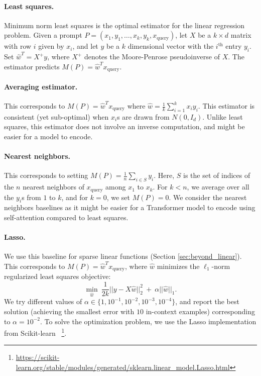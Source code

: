 \paragraph{Least squares.} Minimum norm least squares is the optimal estimator for the linear regression problem. Given a prompt $P = (x_1, y_1, \ldots, x_k, y_k, x_{\text{query}})$, let $X$ be a $k \times d$ matrix with row $i$ given by $x_i$, and let $y$ be a $k$ dimensional vector with the $i^{\text{th}}$ entry $y_i$. Set $\hat{w}^T  = X^{+} y$, where $X^{+}$ denotes the Moore-Penrose pseudoinverse of $X$. The estimator predicts $M(P) = \hat{w}^T x_{\text{query}}$.

\paragraph{Averaging estimator.} This corresponds to $M(P) = \hat{w}^T x_{\text{query}}$ where $\hat{w} = \frac{1}{k} \sum_{i=1}^k x_i y_i$. This estimator is consistent (yet sub-optimal) when $x_i$s are drawn from $N(0, I_d)$. Unlike least squares, this estimator does not involve an inverse computation, and might be easier for a model to encode.

\paragraph{Nearest neighbors.} This corresponds to setting $M(P) = \frac{1}{n} \sum_{i \in S} y_i$. Here, $S$ is the set of indices of the $n$ nearest neighbors of $x_{\text{query}}$ among $x_1$ to $x_k$. For $k < n$, we average over all the $y_i$s from $1$ to $k$, and for $k=0$, we set $M(P) = 0$. 
We consider the nearest neighbors baselines as it might be easier for a Transformer model to encode using self-attention compared to least squares.


\paragraph{Lasso.} We use this baseline for sparse linear functions (Section \ref{sec:beyond_linear}). This corresponds to $M(P) = \hat{w}^T x_{\text{query}}$, where $\hat{w}$ minimizes the $\ell_1$-norm regularized least squares objective:
\[
\min_{\hat{w}} ~ \frac{1}{2k}|| y - X\hat{w}||_2^2 ~ + ~ \alpha ||\hat{w}||_1.
\]
 We try different values of $\alpha \in \{ 1, 10^{-1}, 10^{-2}, 10^{-3}, 10^{-4} \}$, and report the best solution (achieving the smallest error with $10$ in-context examples) corresponding to $\alpha = 10^{-2}$. To solve the optimization problem, we use the Lasso implementation from Scikit-learn \citep{scikit-learn}
 ~\footnote{\scriptsize\url{https://scikit-learn.org/stable/modules/generated/sklearn.linear_model.Lasso.html}}.

